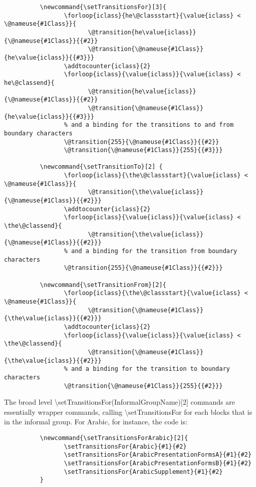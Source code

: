 \documentclass{article}
\begin{document}
		\disableTransitionRules
		\begin{verbatim}
　　　　　　\newcommand{\setTransitionsFor}[3]{
　　　　　　　　　　\forloop{iclass}{he\@classstart}{\value{iclass} < \@nameuse{#1Class}}{
　　　　　　　　　　　　　　\@transition{he\value{iclass}}{\@nameuse{#1Class}}{{#2}}
　　　　　　　　　　　　　　\@transition{\@nameuse{#1Class}}{he\value{iclass}}{{#3}}}
　　　　　　　　　　\addtocounter{iclass}{2}
　　　　　　　　　　\forloop{iclass}{\value{iclass}}{\value{iclass} < he\@classend}{
　　　　　　　　　　　　　　\@transition{he\value{iclass}}{\@nameuse{#1Class}}{{#2}}
　　　　　　　　　　　　　　\@transition{\@nameuse{#1Class}}{he\value{iclass}}{{#3}}}
　　　　　　　　　　% and a binding for the transitions to and from boundary characters
　　　　　　　　　　\@transition{255}{\@nameuse{#1Class}}{{#2}}
　　　　　　　　　　\@transition{\@nameuse{#1Class}}{255}{{#3}}}
　　　　　　
　　　　　　\newcommand{\setTransitionTo}[2] {
　　　　　　　　　　\forloop{iclass}{\the\@classstart}{\value{iclass} < \@nameuse{#1Class}}{
　　　　　　　　　　　　　　\@transition{\the\value{iclass}}{\@nameuse{#1Class}}{{#2}}}
　　　　　　　　　　\addtocounter{iclass}{2}
　　　　　　　　　　\forloop{iclass}{\value{iclass}}{\value{iclass} < \the\@classend}{
　　　　　　　　　　　　　　\@transition{\the\value{iclass}}{\@nameuse{#1Class}}{{#2}}}
　　　　　　　　　　% and a binding for the transition from boundary characters
　　　　　　　　　　\@transition{255}{\@nameuse{#1Class}}{{#2}}}						
　　　　　　
　　　　　　\newcommand{\setTransitionFrom}[2]{
　　　　　　　　　　\forloop{iclass}{\the\@classstart}{\value{iclass} < \@nameuse{#1Class}}{
　　　　　　　　　　　　　　\@transition{\@nameuse{#1Class}}{\the\value{iclass}}{{#2}}}
　　　　　　　　　　\addtocounter{iclass}{2}
　　　　　　　　　　\forloop{iclass}{\value{iclass}}{\value{iclass} < \the\@classend}{
　　　　　　　　　　　　　　\@transition{\@nameuse{#1Class}}{\the\value{iclass}}{{#2}}}
　　　　　　　　　　% and a binding for the transition to boundary characters
　　　　　　　　　　\@transition{\@nameuse{#1Class}}{255}{{#2}}}
		\end{verbatim}
		\enableTransitionRules
		
		The broad level \textbackslash setTransitionsFor(InformalGroupName)[2] commands are essentially wrapper commands, calling \textbackslash setTransitionsFor for each blocks that is in the informal group. For Arabic, for instance, the code is:
		
		\disableTransitionRules
		\begin{verbatim}
　　　　　　\newcommand{\setTransitionsForArabic}[2]{
　　　　　　　　　　\setTransitionsFor{Arabic}{#1}{#2}
　　　　　　　　　　\setTransitionsFor{ArabicPresentationFormsA}{#1}{#2}
　　　　　　　　　　\setTransitionsFor{ArabicPresentationFormsB}{#1}{#2}
　　　　　　　　　　\setTransitionsFor{ArabicSupplement}{#1}{#2}
　　　　　　}
		\end{verbatim}
		\enableTransitionRules
		
\end{document}
